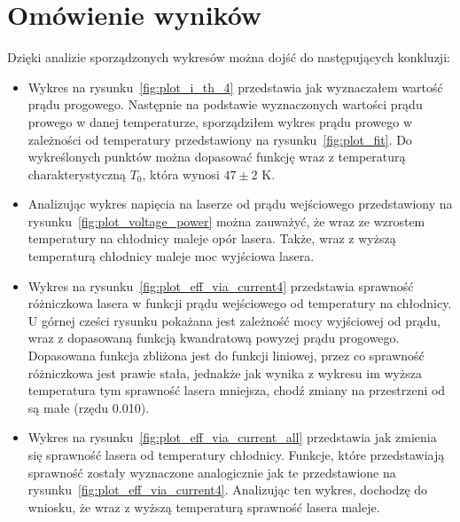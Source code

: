 \section{Omówienie wyników}
Dzięki analizie sporządzonych wykresów można dojść do następujących konkluzji:
\begin{itemize}
\item Wykres na rysunku~\ref{fig:plot_i_th_4} przedstawia jak wyznaczałem wartość prądu progowego. Następnie na podstawie
wyznaczonych wartości prądu prowego w danej temperaturze, sporządziłem wykres prądu prowego w zależności od temperatury
przedstawiony na rysunku~\ref{fig:plot_fit}. Do wykreślonych punktów można dopasować funkcję wraz z temperaturą charakterystyczną
$T_0$, która wynosi $47 \pm 2$ K.
\item Analizując wykres napięcia na laserze od prądu wejściowego przedstawiony na rysunku~\ref{fig:plot_voltage_power}
można zauważyć, że wraz ze wzrostem temperatury na chłodnicy
maleje opór lasera. Także, wraz z wyższą temperaturą chłodnicy maleje moc wyjściowa lasera.
\item Wykres na rysunku~\ref{fig:plot_eff_via_current4} przedstawia sprawność różniczkowa lasera w funkcji prądu wejściowego
od temperatury na chłodnicy. U górnej cześci rysunku pokażana jest zależność mocy wyjściowej od prądu, wraz z dopasowaną
 funkcją kwandratową powyzej prądu progowego. Dopasowana funkcja zbliżona jest do funkcji liniowej, przez co sprawność różniczkowa jest
 prawie stała, jednakże  jak wynika z wykresu im wyższa temperatura tym sprawność lasera mniejsza, chodź zmiany na
 przestrzeni od są małe (rzędu 0.010).
\item Wykres na rysunku~\ref{fig:plot_eff_via_current_all} przedstawia jak zmienia się sprawność lasera od temperatury chłodnicy.
Funkcje, które przedstawiają sprawność zostały wyznaczone analogicznie jak te przedstawione na rysunku~\ref{fig:plot_eff_via_current4}.
Analizując ten wykres, dochodzę do wniosku, że wraz z wyższą temperaturą sprawność lasera maleje.
\end{itemize}